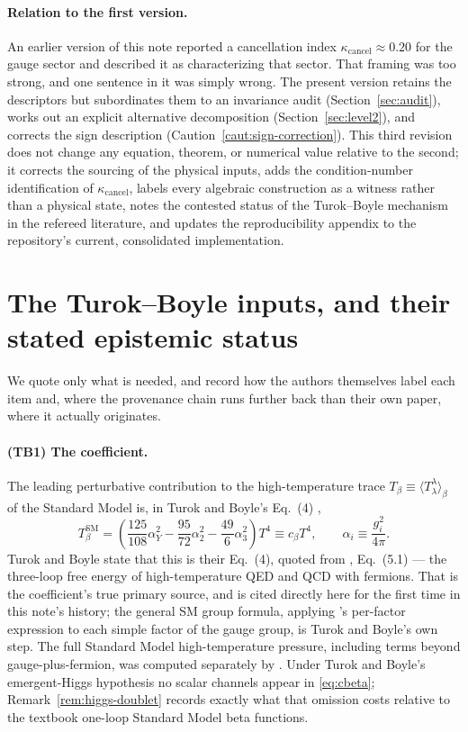 \documentclass[11pt]{article}
\theoremstyle{definition}
\theoremstyle{remark}
\newcommand{\kcancel}{\kappa_{\mathrm{cancel}}}
\begin{document}
\paragraph{Relation to the first version.} An earlier version of this note \citep{DeJesusFirstVersion2026}
reported a cancellation index $\kcancel \approx 0.20$ for the gauge sector and described it as
characterizing that sector. That framing was too strong, and one sentence in it was simply wrong.
The present version retains the descriptors but subordinates them to an invariance audit
(Section~\ref{sec:audit}), works out an explicit alternative decomposition
(Section~\ref{sec:level2}), and corrects the sign description (Caution~\ref{caut:sign-correction}).
This third revision does not change any equation, theorem, or numerical value relative to the second;
it corrects the sourcing of the physical inputs, adds the condition-number identification of
$\kcancel$, labels every algebraic construction as a witness rather than a physical state, notes
the contested status of the Turok--Boyle mechanism in the refereed literature, and updates the
reproducibility appendix to the repository's current, consolidated implementation.

\section{The Turok--Boyle inputs, and their stated epistemic status}
\label{sec:inputs}

We quote only what is needed, and record how the authors themselves label each item and, where the
provenance chain runs further back than their own paper, where it actually originates.

\paragraph{(TB1) The coefficient.} The leading perturbative contribution to the high-temperature
trace $T_\beta \equiv \langle T^\lambda_\lambda\rangle_\beta$ of the Standard Model is, in Turok and
Boyle's Eq.~(4) \citep{TurokBoyle2023},
\begin{equation}
T_\beta^{\mathrm{SM}} = \left(\frac{125}{108}\alpha_Y^2 - \frac{95}{72}\alpha_2^2 -
\frac{49}{6}\alpha_3^2\right) T^4 \equiv c_\beta T^4, \qquad \alpha_i \equiv \frac{g_i^2}{4\pi}.
\label{eq:cbeta}
\end{equation}
Turok and Boyle state that this is their Eq.~(4), quoted from \citet{ArnoldZhai1995}, Eq.~(5.1) ---
the three-loop free energy of high-temperature QED and QCD with fermions. That is the coefficient's
true primary source, and \citet{ArnoldZhai1995} is cited directly here for the first time in this
note's history; the general SM group formula, applying \citeauthor{ArnoldZhai1995}'s per-factor
expression to each simple factor of the gauge group, is Turok and Boyle's own step. The full
Standard Model high-temperature pressure, including terms beyond gauge-plus-fermion, was computed
separately by \citet{GyntherVepsalainen2006}. Under Turok and Boyle's emergent-Higgs hypothesis no
scalar channels appear in \eqref{eq:cbeta}; Remark~\ref{rem:higgs-doublet} records exactly what that
omission costs relative to the textbook one-loop Standard Model beta functions.
\end{document}
